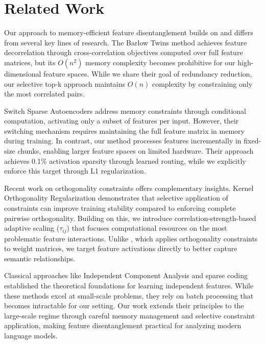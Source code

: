 \documentclass{article} %
\begin{document}
\section{Related Work}
\label{sec:related}

Our approach to memory-efficient feature disentanglement builds on and differs from several key lines of research. The Barlow Twins method \cite{Zbontar2021BarlowTS} achieves feature decorrelation through cross-correlation objectives computed over full feature matrices, but its $O(n^2)$ memory complexity becomes prohibitive for our high-dimensional feature spaces. While we share their goal of redundancy reduction, our selective top-k approach maintains $O(n)$ complexity by constraining only the most correlated pairs.

Switch Sparse Autoencoders \cite{Mudide2024EfficientDL} address memory constraints through conditional computation, activating only a subset of features per input. However, their switching mechanism requires maintaining the full feature matrix in memory during training. In contrast, our method processes features incrementally in fixed-size chunks, enabling larger feature spaces on limited hardware. Their approach achieves 0.1\% activation sparsity through learned routing, while we explicitly enforce this target through L1 regularization.

Recent work on orthogonality constraints offers complementary insights. Kernel Orthogonality Regularization \cite{Kim2022RevisitingOR} demonstrates that selective application of constraints can improve training stability compared to enforcing complete pairwise orthogonality. Building on this, we introduce correlation-strength-based adaptive scaling ($\tau_{ij}$) that focuses computational resources on the most problematic feature interactions. Unlike \cite{Vorontsov2017OnOA}, which applies orthogonality constraints to weight matrices, we target feature activations directly to better capture semantic relationships.

Classical approaches like Independent Component Analysis \cite{Bell1995AnIA} and sparse coding \cite{Lee2006EfficientSC} established the theoretical foundations for learning independent features. While these methods excel at small-scale problems, they rely on batch processing that becomes intractable for our setting. Our work extends their principles to the large-scale regime through careful memory management and selective constraint application, making feature disentanglement practical for analyzing modern language models.
\end{document}
